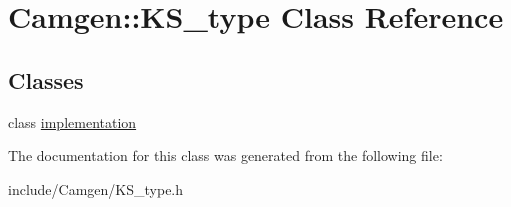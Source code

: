 \hypertarget{a00318}{\section{Camgen\-:\-:K\-S\-\_\-type Class Reference}
\label{a00318}
}
\subsection*{Classes}
\begin{DoxyCompactItemize}
\item 
class \hyperlink{a00290}{implementation}
\end{DoxyCompactItemize}


The documentation for this class was generated from the following file\-:\begin{DoxyCompactItemize}
\item 
include/\-Camgen/K\-S\-\_\-type.\-h\end{DoxyCompactItemize}
